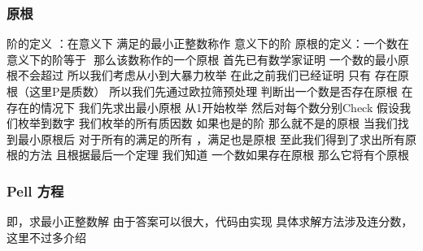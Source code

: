\documentclass[8pt,a4paper]{article}
\newcommand{\code}[1]{
    
}
\newcommand{\txt}[1]{\par\noindent\footnotesize #1}
\newcommand{\inlineformula}[1]{\ensuremath{}}
\begin{document}
\begin{multicols}{2}
        \subsubsection{原根}
            \txt{阶的定义 ：在\inlineformula{./assets/formulas_tex/formula_105.tex}意义下 满足\inlineformula{./assets/formulas_tex/formula_106.tex}的最小正整数\inlineformula{./assets/formulas_tex/formula_107.tex}称作\inlineformula{./assets/formulas_tex/formula_108.tex}\inlineformula{./assets/formulas_tex/formula_109.tex} 意义下的阶
原根的定义：一个数在\inlineformula{./assets/formulas_tex/formula_110.tex}意义下的阶等于 \inlineformula{./assets/formulas_tex/formula_111.tex} 那么该数称作\inlineformula{./assets/formulas_tex/formula_112.tex}的一个原根
首先已有数学家证明 一个数\inlineformula{./assets/formulas_tex/formula_113.tex}的最小原根不会超过\inlineformula{./assets/formulas_tex/formula_114.tex}
所以我们考虑从小到大暴力枚举
在此之前我们已经证明 只有 \inlineformula{./assets/formulas_tex/formula_115.tex}存在原根（这里P是质数）
所以我们先通过欧拉筛预处理 判断出一个数是否存在原根
在存在的情况下 我们先求出最小原根  从1开始枚举 然后对每个数分别Check
假设我们枚举到数字\inlineformula{./assets/formulas_tex/formula_116.tex} 我们枚举\inlineformula{./assets/formulas_tex/formula_117.tex}的所有质因数\inlineformula{./assets/formulas_tex/formula_118.tex} 如果\inlineformula{./assets/formulas_tex/formula_119.tex}也是\inlineformula{./assets/formulas_tex/formula_120.tex}的阶  那么\inlineformula{./assets/formulas_tex/formula_121.tex}就不是\inlineformula{./assets/formulas_tex/formula_122.tex}的原根
当我们找到最小原根\inlineformula{./assets/formulas_tex/formula_123.tex}后 对于所有的\inlineformula{./assets/formulas_tex/formula_124.tex}满足\inlineformula{./assets/formulas_tex/formula_125.tex}的所有\inlineformula{./assets/formulas_tex/formula_126.tex} ，满足\inlineformula{./assets/formulas_tex/formula_127.tex}也是原根
至此我们得到了求出所有原根的方法
且根据最后一个定理 我们知道 一个数\inlineformula{./assets/formulas_tex/formula_128.tex}如果存在原根 那么它将有\inlineformula{./assets/formulas_tex/formula_129.tex}个原根}
            \code{src/number_theory/数论定理_10_5.cpp}
        \subsubsection{Pell 方程}
            \txt{即\inlineformula{./assets/formulas_tex/formula_131.tex}，求最小正整数解\inlineformula{./assets/formulas_tex/formula_132.tex}
由于答案可以很大，代码由\inlineformula{./assets/formulas_tex/formula_133.tex}实现
具体求解方法涉及连分数，这里不过多介绍}
            \code{src/number_theory/数论定理_11_5.cpp}

\end{multicols}
\end{document}
